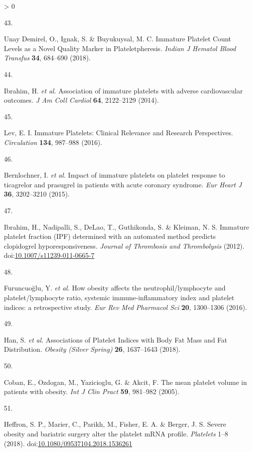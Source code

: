 \documentclass[11pt,twoside]{bristolthesis}
\newlength{\cslhangindent}
\newlength{\csllabelwidth}
\newenvironment{CSLReferences}[2] %
 {%
  \setlength{\parindent}{0pt}
  \ifodd #1 \everypar{\setlength{\hangindent}{\cslhangindent}}\ignorespaces\fi
  \ifnum #2 > 0
  \setlength{\parskip}{#2\baselineskip}
  \fi
 }%
 {}
\newcommand{\CSLLeftMargin}[1]{\parbox[t]{\csllabelwidth}{#1}}
\newcommand{\CSLRightInline}[1]{\parbox[t]{\linewidth - \csllabelwidth}{#1}\break}
\begin{document}
\begin{CSLReferences}{0}{0}
\leavevmode\hypertarget{ref-UnayDemirel2018a}{}%
\CSLLeftMargin{43. }
\CSLRightInline{Unay Demirel, O., Ignak, S. \& Buyukuysal, M. C. {Immature Platelet Count Levels as a Novel Quality Marker in Plateletpheresis}. \emph{Indian J Hematol Blood Transfus} \textbf{34}, 684--690 (2018).}

\leavevmode\hypertarget{ref-Ibrahim2014}{}%
\CSLLeftMargin{44. }
\CSLRightInline{Ibrahim, H. \emph{et al.} {Association of immature platelets with adverse cardiovascular outcomes}. \emph{J Am Coll Cardiol} \textbf{64}, 2122--2129 (2014).}

\leavevmode\hypertarget{ref-Lev2016a}{}%
\CSLLeftMargin{45. }
\CSLRightInline{Lev, E. I. {Immature Platelets: Clinical Relevance and Research Perspectives}. \emph{Circulation} \textbf{134}, 987--988 (2016).}

\leavevmode\hypertarget{ref-Bernlochner2015a}{}%
\CSLLeftMargin{46. }
\CSLRightInline{Bernlochner, I. \emph{et al.} {Impact of immature platelets on platelet response to ticagrelor and prasugrel in patients with acute coronary syndrome}. \emph{Eur Heart J} \textbf{36}, 3202--3210 (2015).}

\leavevmode\hypertarget{ref-Ibrahim2012}{}%
\CSLLeftMargin{47. }
\CSLRightInline{Ibrahim, H., Nadipalli, S., DeLao, T., Guthikonda, S. \& Kleiman, N. S. {Immature platelet fraction (IPF) determined with an automated method predicts clopidogrel hyporesponsiveness}. \emph{Journal of Thrombosis and Thrombolysis} (2012). doi:\href{https://doi.org/10.1007/s11239-011-0665-7}{10.1007/s11239-011-0665-7}}

\leavevmode\hypertarget{ref-Furuncuoglu2016}{}%
\CSLLeftMargin{48. }
\CSLRightInline{Furuncuoğlu, Y. \emph{et al.} {How obesity affects the neutrophil/lymphocyte and platelet/lymphocyte ratio, systemic immune-inflammatory index and platelet indices: a retrospective study}. \emph{Eur Rev Med Pharmacol Sci} \textbf{20}, 1300--1306 (2016).}

\leavevmode\hypertarget{ref-Han2018a}{}%
\CSLLeftMargin{49. }
\CSLRightInline{Han, S. \emph{et al.} {Associations of Platelet Indices with Body Fat Mass and Fat Distribution}. \emph{Obesity (Silver Spring)} \textbf{26}, 1637--1643 (2018).}

\leavevmode\hypertarget{ref-Coban2005}{}%
\CSLLeftMargin{50. }
\CSLRightInline{Coban, E., Ozdogan, M., Yazicioglu, G. \& Akcit, F. {The mean platelet volume in patients with obesity}. \emph{Int J Clin Pract} \textbf{59}, 981--982 (2005).}

\leavevmode\hypertarget{ref-Heffron2018}{}%
\CSLLeftMargin{51. }
\CSLRightInline{Heffron, S. P., Marier, C., Parikh, M., Fisher, E. A. \& Berger, J. S. {Severe obesity and bariatric surgery alter the platelet mRNA profile}. \emph{Platelets} 1--8 (2018). doi:\href{https://doi.org/10.1080/09537104.2018.1536261}{10.1080/09537104.2018.1536261}}


\end{CSLReferences}
\end{document}
